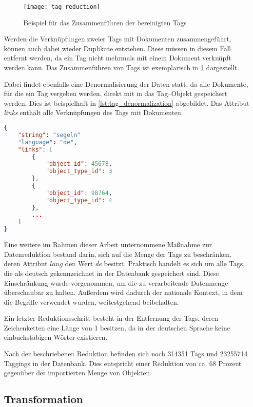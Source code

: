 \begin{figure}[h]
\centering
\texttt{[image: tag\_reduction]}
\caption{Beispiel für das Zusammenführen der bereinigten Tags}
\label{fig:tag_reduction}
\end{figure}

Werden die Verknüpfungen zweier Tags mit Dokumenten zusammengeführt, können auch dabei wieder Duplikate entstehen. Diese müssen in diesem Fall entfernt werden, da ein Tag nicht mehrmals mit einem Dokument verknüpft werden kann. Das Zusammenführen von Tags ist exemplarisch in \cref{fig:tag_reduction} dargestellt.

Dabei findet ebenfalls eine Denormalisierung der Daten statt, da alle Dokumente, für die ein Tag vergeben werden, direkt mit in das Tag--Objekt gespeichert werden. Dies ist beispielhaft in \cref{lst:tag_denormalization} abgebildet. Das Attribut \emph{links} enthält alle Verknüpfungen des Tags mit Dokumenten.

\begin{lstlisting}[language=json, label={lst:tag_denormalization}, caption={JSON--Beispiel für die denormalisierten Tagging-Daten}, float=t]
{
    "string": "segeln"
    "language": "de",
    "links": [
        {
            "object_id": 45678, 
            "object_type_id": 3
        },
        {
            "object_id": 98764, 
            "object_type_id": 4
        },
        ...
    ]
}
\end{lstlisting}

Eine weitere im Rahmen dieser Arbeit unternommene Maßnahme zur Datenreduktion bestand darin, sich auf die Menge der Tags zu beschränken, deren Attribut \(lang\) den Wert \emph{de} besitzt. Praktisch handelt es sich um alle Tags, die als deutsch gekennzeichnet in der Datenbank gespeichert sind. Diese Einschränkung wurde vorgenommen, um die zu verarbeitende Datenmenge überschaubar zu halten. Außerdem wird dadurch der nationale Kontext, in dem die Begriffe verwendet wurden, weitestgehend beibehalten.

Ein letzter Reduktionsschritt besteht in der Entfernung der Tags, deren Zeichenketten eine Länge von \num{1} besitzen, da in der deutschen Sprache keine einbuchstabigen Wörter existieren.

Nach der beschriebenen Reduktion befinden sich noch \num{314351} Tags und \num{23255714} Taggings in der Datenbank. Dies entspricht einer Reduktion von ca. \num{68} Prozent gegenüber der importierten Menge von Objekten.

\subsection{Transformation}

